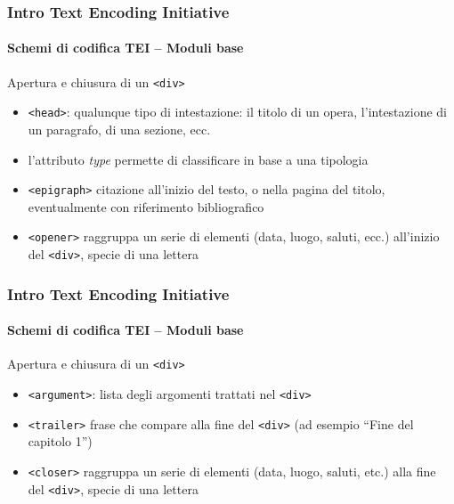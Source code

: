 \begin{frame}
	\frametitle{Intro Text Encoding Initiative}
	\framesubtitle{Schemi di codifica TEI – Moduli base}
	\addtocounter{nframe}{1}

	\begin{block}{Apertura e chiusura di un \texttt{<div>}}
        \begin{itemize}
            \item \texttt{<head>}: qualunque tipo di intestazione: il titolo di un opera, l’intestazione di un paragrafo, di una sezione, ecc.
            \item l'attributo \textit{type} permette di classificare in base a una tipologia
            \item \texttt{<epigraph>} citazione all’inizio del testo, o nella pagina del titolo, eventualmente con riferimento bibliografico
            \item \texttt{<opener>} raggruppa un serie di elementi (data, luogo, saluti, ecc.) all’inizio del \texttt{<div>}, specie di una lettera
        \end{itemize}
    \end{block}

\end{frame}

\begin{frame}
	\frametitle{Intro Text Encoding Initiative}
	\framesubtitle{Schemi di codifica TEI – Moduli base}
	\addtocounter{nframe}{1}

	\begin{block}{Apertura e chiusura di un \texttt{<div>}}
        \begin{itemize}
            \item \texttt{<argument>}: lista degli argomenti trattati nel \texttt{<div>}
            \item \texttt{<trailer>} frase che compare alla fine del \texttt{<div>} (ad esempio ``Fine del capitolo 1'')
            \item \texttt{<closer>} raggruppa un serie di elementi (data, luogo, saluti, etc.) alla fine del \texttt{<div>}, specie di una lettera
        \end{itemize}
    \end{block}

\end{frame}


